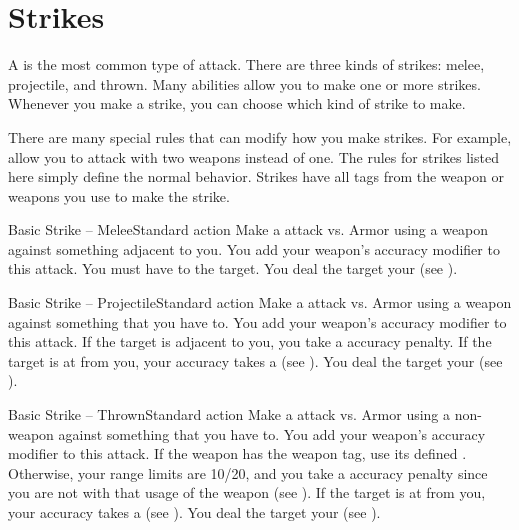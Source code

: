 \section{Strikes}\label{Strikes}
  A  is the most common type of attack.
  There are three kinds of strikes: melee, projectile, and thrown.
  Many abilities allow you to make one or more strikes.
  Whenever you make a strike, you can choose which kind of strike to make.

  There are many special rules that can modify how you make strikes.
  For example,  allow you to attack with two weapons instead of one.
  The rules for strikes listed here simply define the normal behavior.
  Strikes have all tags from the weapon or weapons you use to make the strike.

  \begin{activeability}{Basic Strike -- Melee}{Standard action}
    \rankline
    Make a  attack vs. Armor using a weapon against something adjacent to you.
    You add your weapon's accuracy modifier to this attack.
    You must have  to the target.
    \hit You deal the target your  (see ).
  \end{activeability}

  \begin{activeability}{Basic Strike -- Projectile}{Standard action}
    \rankline
    Make a  attack vs. Armor using a  weapon against something that you have  to.
    You add your weapon's accuracy modifier to this attack.
    If the target is adjacent to you, you take a  accuracy penalty.
    If the target is at  from you, your accuracy takes a   (see ).
    \hit You deal the target your  (see ).
  \end{activeability}

  \begin{activeability}{Basic Strike -- Thrown}{Standard action}
    \rankline
    Make a  attack vs. Armor using a non- weapon against something that you have  to.
    You add your weapon's accuracy modifier to this attack.
    If the weapon has the  weapon tag, use its defined .
    Otherwise, your range limits are 10/20, and you take a  accuracy penalty since you are not  with that usage of the weapon (see ).
    If the target is at  from you, your accuracy takes a   (see ).
    \hit You deal the target your  (see ).
  \end{activeability}

